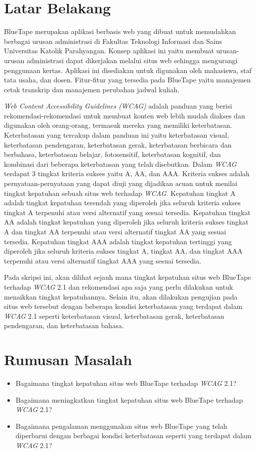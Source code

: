 \documentclass[a4paper,twoside]{article}
\begin{document}
\section{Latar Belakang}
BlueTape merupakan aplikasi berbasis web yang dibuat untuk memudahkan berbagai urusan administrasi di Fakultas Teknologi Informasi dan Sains Universitas Katolik Parahyangan. Konsep aplikasi ini yaitu membuat urusan-urusan administrasi dapat dikerjakan melalui situs web sehingga mengurangi penggunaan kertas. Aplikasi ini disediakan untuk digunakan oleh mahasiswa, staf tata usaha, dan dosen. Fitur-fitur yang tersedia pada BlueTape yaitu manajemen cetak transkrip dan manajemen perubahan jadwal kuliah.

\textit{Web Content Accessibility Guidelines (WCAG)} adalah panduan yang berisi rekomendasi-rekomendasi untuk membuat konten web lebih mudah diakses dan digunakan oleh orang-orang, termasuk mereka yang memiliki keterbatasan. Keterbatasan yang tercakup dalam panduan ini yaitu keterbatasan visual, keterbatasan pendengaran, keterbatasan gerak, keterbatasan berbicara dan berbahasa, keterbatasan belajar, fotosensitif, keterbatasan kognitif, dan kombinasi dari beberapa keterbatasan yang telah disebutkan. Dalam \textit{WCAG} terdapat 3 tingkat kriteria sukses yaitu A, AA, dan AAA. Kriteria sukses adalah pernyataan-pernyataan yang dapat diuji yang dijadikan acuan untuk menilai tingkat kepatuhan sebuah situs web terhadap \textit{WCAG}. Kepatuhan tingkat A adalah tingkat kepatuhan terendah yang diperoleh jika seluruh kriteria sukses tingkat A terpenuhi atau versi alternatif yang sesuai tersedia. Kepatuhan tingkat AA adalah tingkat kepatuhan yang diperoleh jika seluruh kriteria sukses tingkat A dan tingkat AA terpenuhi atau versi alternatif tingkat AA yang sesuai tersedia. Kepatuhan tingkat AAA adalah tingkat kepatuhan tertinggi yang diperoleh jika seluruh kriteria sukses tingkat A, tingkat AA, dan tingkat AAA terpenuhi atau versi alternatif tingkat AAA yang sesuai tersedia.

Pada skripsi ini, akan dilihat sejauh mana tingkat kepatuhan situs web BlueTape terhadap \textit{WCAG} 2.1 dan rekomendasi apa saja yang perlu dilakukan untuk menaikkan tingkat kepatuhannya. Selain itu, akan dilakukan pengujian pada situs web tersebut dengan beberapa kondisi keterbatasan yang terdapat dalam \textit{WCAG} 2.1 seperti keterbatasan visual, keterbatasan gerak, keterbatasan pendengaran, dan keterbatasan bahasa.

\section{Rumusan Masalah}
\begin{itemize}
	\item Bagaimana tingkat kepatuhan situs web BlueTape terhadap \textit{WCAG} 2.1?
	\item Bagaimana meningkatkan tingkat kepatuhan situs web BlueTape terhadap \textit{WCAG} 2.1?  
	\item Bagaimana pengalaman menggunakan situs web BlueTape yang telah diperbarui dengan berbagai kondisi keterbatasan seperti yang terdapat dalam \textit{WCAG} 2.1?
\end{itemize}
\end{document}
